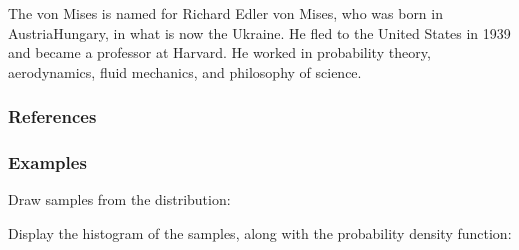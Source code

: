\documentclass[letterpaper,10pt,english]{sphinxmanual}
\begin{document}
\begin{fulllineitems}
\sphinxAtStartPar
The von Mises is named for Richard Edler von Mises, who was born in
Austria\sphinxhyphen{}Hungary, in what is now the Ukraine.  He fled to the United
States in 1939 and became a professor at Harvard.  He worked in
probability theory, aerodynamics, fluid mechanics, and philosophy of
science.
\subsubsection*{References}
\subsubsection*{Examples}

\sphinxAtStartPar
Draw samples from the distribution:

\begin{sphinxVerbatim}[commandchars=\\\{\}]
     
    
\end{sphinxVerbatim}

\sphinxAtStartPar
Display the histogram of the samples, along with
the probability density function:

\begin{sphinxVerbatim}[commandchars=\\\{\}]
   
     
  
    
    
     
\end{sphinxVerbatim}


\end{fulllineitems}
\end{document}
